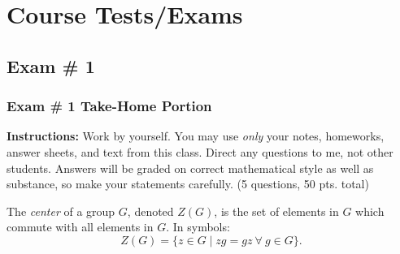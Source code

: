 \setcounter{chapter}{4}
\chapter*{Course Tests/Exams}
\addtocounter{chapter}{1} %
\setcounter{section}{0}

\section{Exam \# 1 }
\subsection{Exam \# 1 Take-Home Portion}
\noindent\textbf{Instructions:} Work by yourself. You may use \textit{only} your notes, homeworks, answer sheets, and text from this class. Direct any questions to me, not other students. Answers will be graded on correct mathematical style as well as substance, so make your statements carefully. (5 questions, 50 pts. total)

\begin{definition}
The \textit{center} of a group $ G $, denoted $ Z(G) $, is the set of elements in $ G $ which commute with all elements in $ G $. In symbols:
\[
Z(G) = \{ z \in G \mid zg = gz \ \forall \ g \in G \}.
\]
\end{definition}

